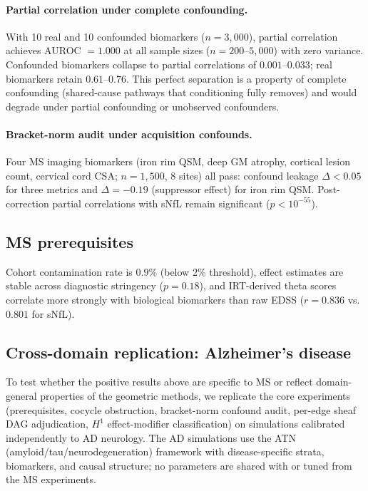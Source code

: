 \documentclass{article}
\begin{document}
\paragraph{Partial correlation under complete confounding.}
With 10 real and 10 confounded biomarkers ($n = 3{,}000$), partial correlation achieves AUROC $= 1.000$ at all sample sizes ($n = 200$--$5{,}000$) with zero variance.
Confounded biomarkers collapse to partial correlations of $0.001$--$0.033$; real biomarkers retain $0.61$--$0.76$.
This perfect separation is a property of complete confounding (shared-cause pathways that conditioning fully removes) and would degrade under partial confounding or unobserved confounders.

\paragraph{Bracket-norm audit under acquisition confounds.}
Four MS imaging biomarkers (iron rim QSM, deep GM atrophy, cortical lesion count, cervical cord CSA; $n = 1{,}500$, 8 sites) all pass: confound leakage $\Delta < 0.05$ for three metrics and $\Delta = -0.19$ (suppressor effect) for iron rim QSM.
Post-correction partial correlations with sNfL remain significant ($p < 10^{-55}$).

\subsection{MS prerequisites}

Cohort contamination rate is $0.9\%$ (below 2\% threshold), effect estimates are stable across diagnostic stringency ($p = 0.18$), and IRT-derived theta scores correlate more strongly with biological biomarkers than raw EDSS ($r = 0.836$ vs.\ $0.801$ for sNfL).

\subsection{Cross-domain replication: Alzheimer's disease}
\label{sec:ad}
\label{sec:res-ad}

To test whether the positive results above are specific to MS or reflect domain-general properties of the geometric methods, we replicate the core experiments (prerequisites, cocycle obstruction, bracket-norm confound audit, per-edge sheaf DAG adjudication, $H^1$ effect-modifier classification) on simulations calibrated independently to AD neurology.
The AD simulations use the ATN (amyloid/tau/neurodegeneration) framework \citep{jack2018niaaa} with disease-specific strata, biomarkers, and causal structure; no parameters are shared with or tuned from the MS experiments.
\end{document}
